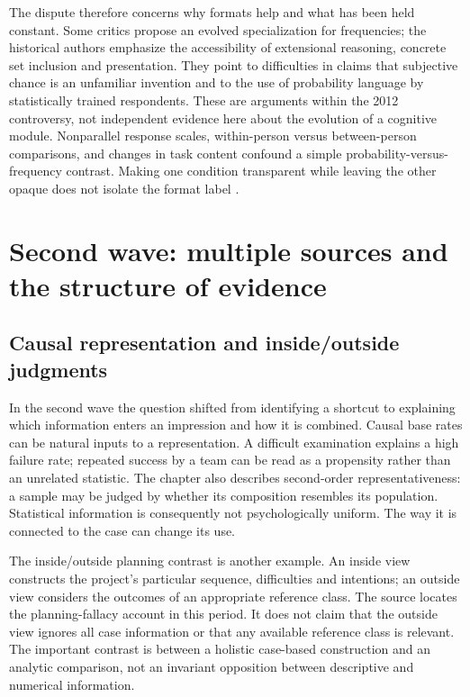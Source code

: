 The dispute therefore concerns why formats help and what has been held
constant. Some critics propose an evolved specialization for frequencies;
the historical authors emphasize the accessibility of extensional reasoning,
concrete set inclusion and presentation. They point to difficulties in
claims that subjective chance is an unfamiliar invention and to the use
of probability language by statistically trained respondents. These are
arguments within the 2012 controversy, not independent evidence here about
the evolution of a cognitive module. Nonparallel response scales,
within-person versus between-person comparisons, and changes in task
content confound a simple probability-versus-frequency contrast. Making
one condition transparent while leaving the other opaque does not isolate
the format label
\cite[pp.~335--336]{GriffinEtAl2012HeuristicsHistory}.

\section{Second wave: multiple sources and the structure of evidence}
\label{sec:p19-hph-second-wave}

\subsection{Causal representation and inside/outside judgments}

In the second wave the question shifted from identifying a shortcut to
explaining which information enters an impression and how it is combined.
Causal base rates can be natural inputs to a representation. A difficult
examination explains a high failure rate; repeated success by a team can
be read as a propensity rather than an unrelated statistic. The chapter
also describes second-order representativeness: a sample may be judged
by whether its composition resembles its population. Statistical
information is consequently not psychologically uniform. The way it
is connected to the case can change its use.

The inside/outside planning contrast is another example. An inside view
constructs the project's particular sequence, difficulties and intentions;
an outside view considers the outcomes of an appropriate reference class.
The source locates the planning-fallacy account in this period. It does
not claim that the outside view ignores all case information or that any
available reference class is relevant. The important contrast is between
a holistic case-based construction and an analytic comparison, not an
invariant opposition between descriptive and numerical information.

